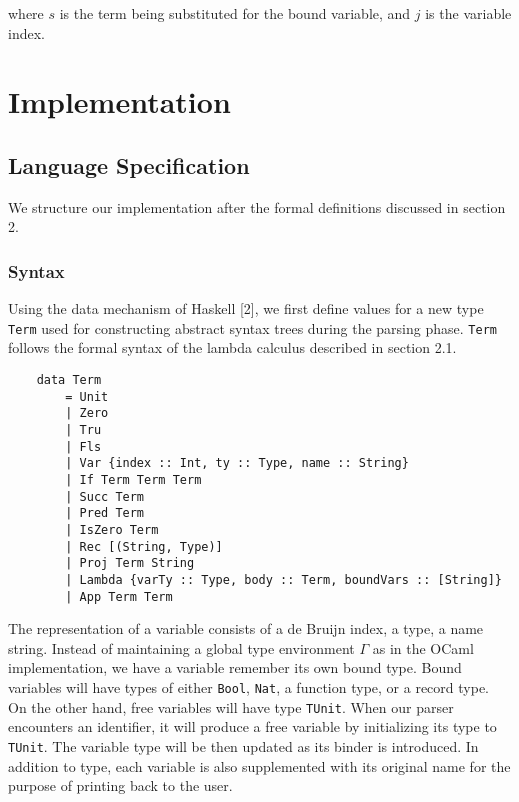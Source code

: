 \documentclass[fleqn, 11pt]{article}
\begin{document}
\noindent
where $s$ is the term being substituted for the bound variable, and $j$ is the variable index.

\section{Implementation}

\subsection{Language Specification}

We structure our implementation after the formal definitions discussed in section 2.

\subsubsection{Syntax}

Using the data mechanism of Haskell [2], we first define values for a new type \texttt{Term} used for constructing abstract syntax trees 
during the parsing phase. \texttt{Term} follows the formal syntax of the lambda calculus described in section 2.1.

\begin{Verbatim}
    data Term 
        = Unit                                                      
        | Zero                                                       
        | Tru                                                       
        | Fls                                                         
        | Var {index :: Int, ty :: Type, name :: String}             
        | If Term Term Term                                          
        | Succ Term                                                 
        | Pred Term                                                  
        | IsZero Term                                                
        | Rec [(String, Type)]                                       
        | Proj Term String                                            
        | Lambda {varTy :: Type, body :: Term, boundVars :: [String]}
        | App Term Term                                              
\end{Verbatim}

The representation of a variable consists of a de Bruijn index, a type, a name string. Instead of maintaining a global type environment 
$\Gamma$ as in the OCaml implementation, we have a variable remember its own bound type. Bound variables will have types of either 
\texttt{Bool}, \texttt{Nat}, a function type, or a record type. On the other hand, free variables will have type \texttt{TUnit}.
When our parser encounters an identifier, it will produce a free variable by initializing its type to \texttt{TUnit}. The variable 
type will be then updated as its binder is introduced. In addition to type, each variable is also supplemented with its original name 
for the purpose of printing back to the user. 
\end{document}
